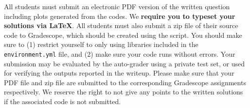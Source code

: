 All students must submit an electronic PDF version of the written question including plots generated from the codes. We
{\bf require you to typeset your solutions via \LaTeX}.
All students must also submit a zip file of
their source code to Gradescope, which should be created using the
 script. You
should make sure to (1) restrict yourself to only using libraries included in
the
\texttt{environment.yml} file, and (2) make sure your code runs without errors.
Your submission may be evaluated by the
auto-grader using a private test set, or used for verifying the outputs reported in the writeup. Please make sure that your PDF file and zip file are submitted to the corresponding Gradescope assignments respectively. We reserve the right to not give any points to the written solutions if the associated code is not submitted.

\vspace{0.1in}
